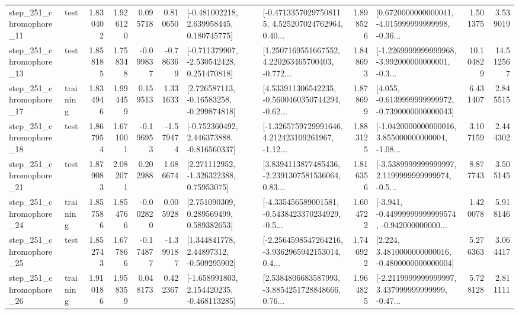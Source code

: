 \begin{tabular}{llrrrrllrlrr}
  step\_251\_chromophore\_11 &      test &      1.830402 &    1.926120 &      0.095718 &  0.810650 &    [-0.481002218, 2.639958445, 0.180745775] &  [-0.47133570297508115, 4.525207024762964, 0.40... &       1.898526 &  [0.6720000000000041, -4.015999999999998, -0.36... &            1.501375 &          3.539019 \\
  step\_251\_chromophore\_13 &      test &      1.858185 &    1.758348 &     -0.099837 & -0.786369 &   [-0.711379907, -2.530542428, 0.251470818] &  [1.2507169551667552, 4.220263465700403, -0.772... &       1.848693 &  [-1.2269999999999968, -3.992000000000001, -0.3... &           10.104829 &         14.512567 \\
  step\_251\_chromophore\_17 &  training &      1.834946 &    1.994459 &      0.159513 &  1.331633 &    [2.726587113, -0.16583258, -0.299874818] &  [4.533911306542235, -0.5600460350744294, -0.62... &       1.878699 &  [4.055, -0.6139999999999972, -0.7390000000000043] &            6.431407 &          2.845515 \\
  step\_251\_chromophore\_18 &      test &      1.867954 &    1.671001 &     -0.196953 & -1.579474 &   [-0.752360492, 2.446373888, -0.816560337] &  [-1.3265759729991646, 4.212423109261967, -1.12... &       1.883125 &  [-1.0420000000000016, 3.855000000000004, -1.08... &            3.107159 &          2.444302 \\
  step\_251\_chromophore\_21 &      test &      1.879083 &    2.082071 &      0.202988 &  1.686674 &     [2.271112952, -1.326322388, 0.75953075] &  [3.8394113877485436, -2.2391307581536064, 0.83... &       1.816356 &  [-3.5389999999999997, 2.1199999999999974, -0.5... &            8.877743 &          3.505145 \\
  step\_251\_chromophore\_24 &  training &      1.857586 &    1.854766 &     -0.002820 &  0.005928 &     [2.751090309, 0.289569499, 0.589382653] &  [-4.335456589001581, -0.5438423370234929, -0.5... &       1.604722 &  [-3.941, -0.44999999999999574, -0.942000000000... &            1.420078 &          5.918146 \\
  step\_251\_chromophore\_25 &      test &      1.852743 &    1.677866 &     -0.174877 & -1.399187 &     [1.344841778, 2.44897312, -0.509295902] &  [-2.2564598547264216, -3.9362965942153014, 0.4... &       1.746922 &   [2.224, 3.4810000000000016, -0.4800000000000004] &            5.276363 &          3.064417 \\
  step\_251\_chromophore\_26 &  training &      1.910186 &    1.958359 &      0.048173 &  0.422367 &   [-1.658991803, 2.154420235, -0.468113285] &  [2.5384806683587993, -3.8854251728848666, 0.76... &       1.964825 &  [-2.2119999999999997, 3.437999999999999, -0.47... &            5.728128 &          2.811111 \\

\end{tabular}
